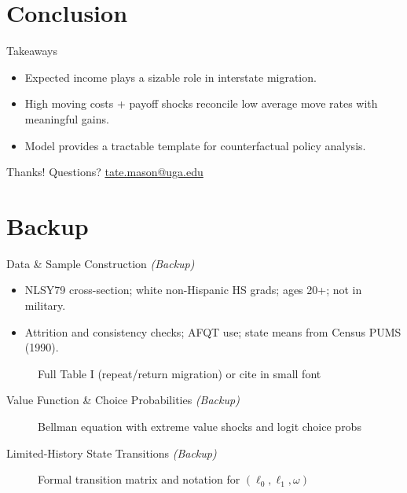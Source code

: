 \documentclass[aspectratio=169,professionalfonts]{beamer}
\newcommand{\figph}[2][0.9\linewidth]{%
  \begin{figure}
    \centering
    \fbox{\rule{0pt}{0.55#1}\rule{#1}{0pt}}%
    \caption{#2}
  \end{figure}
}
\newcommand{\figph}[1]{\begin{center}\fbox{\parbox{0.85\linewidth}{\centering \vspace{0.6em} \textit{#1} \vspace{0.6em}}}\end{center}}
\begin{document}
\section{Conclusion}

\begin{frame}{Takeaways}
  \begin{itemize}
    \item Expected income plays a sizable role in interstate migration.
    \item High moving costs + payoff shocks reconcile low average move rates with meaningful gains.
    \item Model provides a tractable template for counterfactual policy analysis.
  \end{itemize}
\end{frame}

\begin{frame}{Thanks!}
  \centering
  Questions? \quad \href{mailto:}{tate.mason@uga.edu}
\end{frame}

\appendix
\section{Backup}

\begin{frame}{Data \& Sample Construction \textit{(Backup)}}
  \begin{itemize}
    \item NLSY79 cross-section; white non-Hispanic HS grads; ages 20+; not in military.
    \item Attrition and consistency checks; AFQT use; state means from Census PUMS (1990).
  \end{itemize}
  \figph{Full Table I (repeat/return migration) or cite in small font}
\end{frame}

\begin{frame}{Value Function \& Choice Probabilities \textit{(Backup)}}
  \figph{Bellman equation with extreme value shocks and logit choice probs}
\end{frame}

\begin{frame}{Limited-History State Transitions \textit{(Backup)}}
  \figph{Formal transition matrix and notation for $(\ell_0,\ell_1, \omega)$}
\end{frame}
\end{document}
